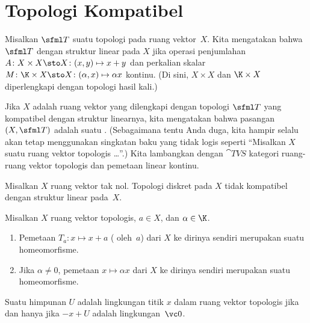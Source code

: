 \section{Topologi Kompatibel}

\begin{defn} Misalkan $\sfml T$ suatu topologi pada ruang vektor~$X$.  Kita mengatakan bahwa $\sfml T$
 dengan struktur linear pada $X$ jika operasi penjumlahan $A\colon X \times X \sto X\colon (x,y) \mapsto x + y$
dan perkalian skalar $M\colon \K \times X \sto X\colon (\alpha,x) \mapsto \alpha x$ kontinu.  (Di sini, $X \times X$ dan
$\K \times X$ diperlengkapi dengan topologi hasil kali.)

Jika $X$ adalah ruang vektor yang dilengkapi dengan topologi $\sfml T$ yang kompatibel dengan struktur linearnya, kita mengatakan bahwa pasangan
$(X,\sfml T)$ adalah suatu
.  (Sebagaimana tentu Anda duga, kita hampir selalu akan tetap menggunakan singkatan baku yang tidak logis seperti
``Misalkan $X$ suatu ruang vektor topologis \dots''.)  Kita lambangkan dengan $\cat{TVS}$ kategori ruang-ruang vektor topologis
dan pemetaan linear kontinu.
\end{defn}

\begin{exam} Misalkan $X$ ruang vektor tak nol.  Topologi diskret pada $X$ tidak kompatibel dengan struktur linear pada~$X$.
\end{exam}

\begin{prop} Misalkan $X$ ruang vektor topologis, $a \in X$, dan $\alpha \in \K$.
   \begin{enumerate}[label=\rm{(\alph*)}]
    \item Pemetaan $T_a\colon x \mapsto x + a$
( oleh~$a$) dari $X$ ke dirinya sendiri merupakan suatu homeomorfisme.
    \item Jika $\alpha \ne 0$, pemetaan $x \mapsto \alpha x$ dari $X$ ke dirinya sendiri merupakan suatu homeomorfisme.
   \end{enumerate}
\end{prop}

\begin{cor} Suatu himpunan $U$ adalah lingkungan titik $x$ dalam ruang vektor topologis jika dan hanya jika $-x + U$ adalah lingkungan~$\vc 0$.
\end{cor}

